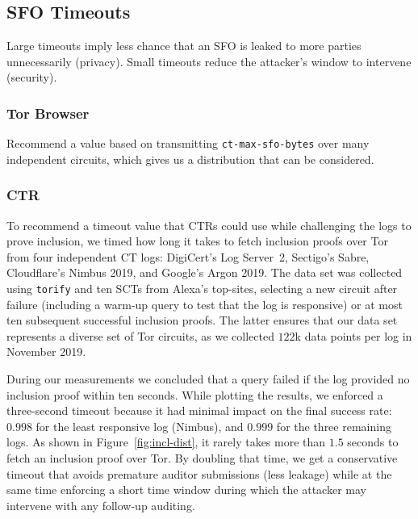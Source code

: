 \subsection{SFO Timeouts}
Large timeouts imply less chance that an SFO is leaked to more parties
unnecessarily (privacy).  Small timeouts reduce the attacker's window to
intervene (security).

\subsubsection{Tor Browser}
Recommend a value based on transmitting \texttt{ct-max-sfo-bytes} over many
independent circuits, which gives us a distribution that can be considered.

\subsubsection{CTR}

To recommend a timeout value that CTRs could use while challenging the logs to
prove inclusion, we timed how long it takes to fetch inclusion proofs over
Tor from four independent CT logs:
	DigiCert's Log Server~2,
	Sectigo's Sabre,
	Cloudflare's Nimbus 2019, and
	Google's Argon 2019.
The data set was collected using \texttt{torify} and ten SCTs from Alexa's
top-sites, selecting a new circuit after failure (including a warm-up query
to test that the log is responsive) or at most ten subsequent successful
inclusion proofs.  The latter ensures that our data set represents a diverse set
of Tor circuits, as we collected $122$k data points per log in November 2019.

During our measurements we concluded that a query failed if the log 
provided no inclusion proof within ten seconds.  While plotting the results,
we enforced a three-second timeout because it had minimal impact on the final
success rate:
	$0.998$ for the least responsive log (Nimbus), and
	$0.999$ for the three remaining logs.
As shown in Figure~\ref{fig:incl-dist}, it rarely takes more than $1.5$ seconds
to fetch an inclusion proof over Tor.  By doubling that time, we get a
conservative timeout that avoids premature auditor submissions (less leakage)
while at the same time enforcing a short time window during which the attacker
may intervene with any follow-up auditing.

